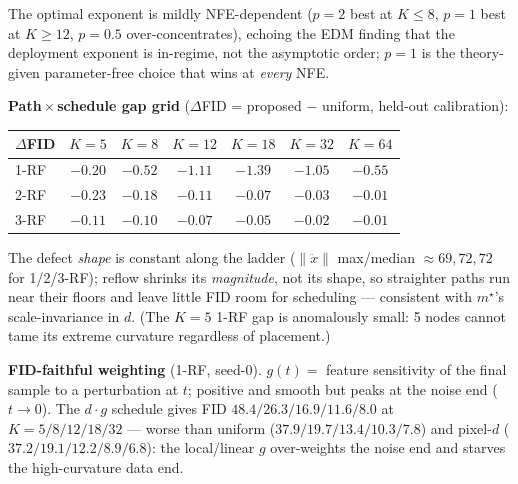 \documentclass[11pt]{article}
\newcommand{\norm}[1]{\lVert #1 \rVert}
\begin{document}
\noindent The optimal exponent is mildly NFE-dependent ($p\!=\!2$ best at
$K\!\le\!8$, $p\!=\!1$ best at $K\!\ge\!12$, $p\!=\!0.5$ over-concentrates),
echoing the EDM finding that the deployment exponent is in-regime, not the
asymptotic order; $p\!=\!1$ is the theory-given parameter-free choice that
wins at \emph{every} NFE.

\medskip
\noindent\textbf{Path\,$\times$\,schedule gap grid} ($\Delta$FID = proposed
$-$ uniform, held-out calibration):

\begin{center}
\begin{tabular}{lcccccc}
\toprule
$\Delta$FID & $K{=}5$ & $K{=}8$ & $K{=}12$ & $K{=}18$ & $K{=}32$ & $K{=}64$\\
\midrule
1-RF & $-0.20$ & $-0.52$ & $-1.11$ & $-1.39$ & $-1.05$ & $-0.55$\\
2-RF & $-0.23$ & $-0.18$ & $-0.11$ & $-0.07$ & $-0.03$ & $-0.01$\\
3-RF & $-0.11$ & $-0.10$ & $-0.07$ & $-0.05$ & $-0.02$ & $-0.01$\\
\bottomrule
\end{tabular}
\end{center}

\noindent The defect \emph{shape} is constant along the ladder
($\norm{\ddot x}$ max/median $\approx69,72,72$ for 1/2/3-RF); reflow shrinks
its \emph{magnitude}, not its shape, so straighter paths run near their
floors and leave little FID room for scheduling --- consistent with
$m^\star$'s scale-invariance in $d$. (The $K\!=\!5$ 1-RF gap is anomalously
small: 5 nodes cannot tame its extreme curvature regardless of placement.)

\medskip
\noindent\textbf{FID-faithful weighting} (1-RF, seed-0). $g(t)=$ feature
sensitivity of the final sample to a perturbation at $t$; positive and
smooth but peaks at the noise end ($t\!\to\!0$). The $d\!\cdot\!g$ schedule
gives FID $48.4/26.3/16.9/11.6/8.0$ at $K\!=\!5/8/12/18/32$ --- worse than
uniform ($37.9/19.7/13.4/10.3/7.8$) and pixel-$d$
($37.2/19.1/12.2/8.9/6.8$): the local/linear $g$ over-weights the noise end
and starves the high-curvature data end.
\end{document}
